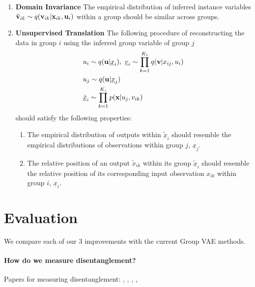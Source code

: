 \documentclass{article}
\begin{document}
\begin{enumerate}
    \item \textbf{Domain Invariance} The empirical distribution of inferred instance variables $\tilde{{\mathbf{v}}}_{ik} \sim q({\mathbf{v}}_{ik} | {\mathbf{x}}_{ik}, {\mathbf{u}}_i)$ within a group should be similar across groups.
    \item \textbf{Unsupervised Translation} The following procedure of reconstructing the data in group $i$ using the inferred group variable of group $j$
    \begin{align}
        & u_i \sim q({\mathbf{u}} | \underline{x}_i), ~ \underline{v}_{i} \sim \prod_{k=1}^{K_i} q({\mathbf{v}} | x_{ij}, u_i) \\
        & u_j \sim q({\mathbf{u}} | \underline{x}_j) \\
        & \underline{\tilde{x}}_i \sim \prod_{k=1}^{K_i} p({\mathbf{x}} | u_j, v_{ik})
    \end{align}
    should satisfy the following properties:
    \begin{enumerate}
        \item The empirical distribution of outputs within $\underline{\tilde{x}}_i$ should resemble the empirical distributions of observations within group $j$, $\underline{x}_j$.
        \item The relative position of an output $\tilde{x}_{ik}$ within its group $\underline{\tilde{x}}_i$ should resemble the relative position of its corresponding input observation $x_{ik}$ within group $i$, $\underline{x}_i$.
    \end{enumerate}
\end{enumerate}

\section{Evaluation}

We compare each of our 3 improvements with the current Group VAE methods.

\paragraph{How do we measure disentanglement?}

Papers for measuring disentanglement: \cite{Locatello2019ChallengingCA}, \cite{Tschannen2018RecentAI}, \cite{Eastwood2018AFF}, \cite{Kim2018DisentanglingBF}, \cite{Steenkiste2019AreDR}
\end{document}
